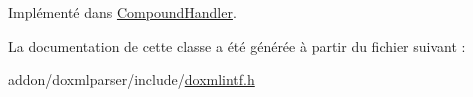 Implémenté dans \hyperlink{class_compound_handler_a136a73ca200bfedee6fa0a547842a204}{Compound\+Handler}.



La documentation de cette classe a été générée à partir du fichier suivant \+:\begin{DoxyCompactItemize}
\item 
addon/doxmlparser/include/\hyperlink{include_2doxmlintf_8h}{doxmlintf.\+h}\end{DoxyCompactItemize}
